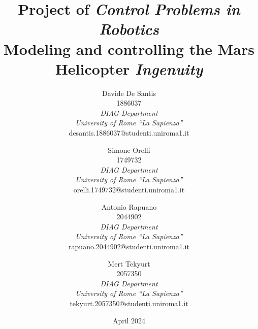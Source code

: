 \documentclass{article}
\title{\large Project of \textit{Control Problems in Robotics} \\ 
\LARGE Modeling and controlling the Mars Helicopter \textit{Ingenuity}}
\author{Davide De Santis \\1886037\\ \textit{DIAG Department}\\ \textit{University of Rome “La Sapienza”}\\desantis.1886037@studenti.uniroma1.it
\and Simone Orelli\\1749732\\ \textit{DIAG Department}\\ \textit{University of Rome “La Sapienza”}\\orelli.1749732@studenti.uniroma1.it 
\and Antonio Rapuano\\2044902\\ \textit{DIAG Department}\\ \textit{University of Rome “La Sapienza”}\\rapuano.2044902@studenti.uniroma1.it
\and Mert Tekyurt\\2057350\\ \textit{DIAG Department} \\ \textit{University of Rome “La Sapienza”}\\tekyurt.2057350@studenti.uniroma1.it}
\date{April 2024}
\begin{document}
    \maketitle
    \thispagestyle{empty}
    \begin{multicols}{2}
    
    \vfill\null
    \columnbreak

    \tableofcontents

    \newpage
    \setcounter{page}{1}
    
    
    
    
    
    
    \end{multicols}


    \nocite{*}
    \printbibliography
\end{document}
